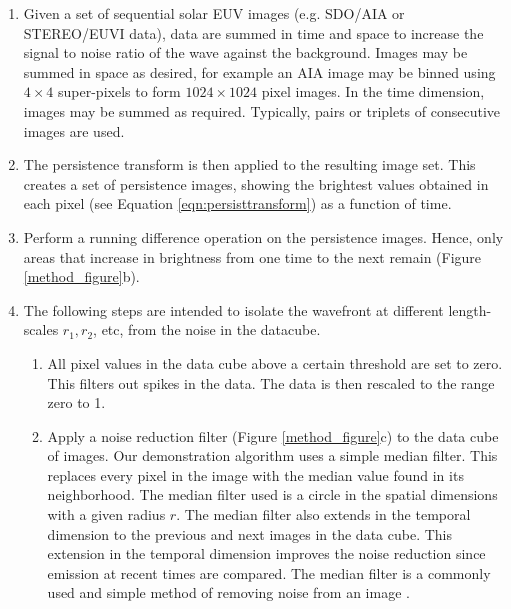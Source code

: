 \begin{enumerate}

\item Given a set of sequential solar EUV images (e.g. SDO/AIA or
  STEREO/EUVI data), data are summed in time and space to increase the
  signal to noise ratio of the wave against the background. Images may
  be summed in space as desired, for example an AIA image may be
  binned using $4\times4$ super-pixels to form $1024\times1024$ pixel
  images. In the time dimension, images may be summed as
  required. Typically, pairs or triplets of consecutive images are
  used.

\item The persistence transform is then applied to the resulting image
  set.  This creates a set of persistence images, showing the
  brightest values obtained in each pixel (see Equation
  \ref{eqn:persisttransform}) as a function of time.

\item Perform a running difference operation on the
  persistence images. Hence, only areas that increase in brightness
  from one time to the next remain (Figure \ref{method_figure}b).

\item 
The following steps are intended to isolate the wavefront at different
length-scales $r_{1}, r_{2}$\textellipsis, etc, from the noise in the
datacube.

\begin{enumerate}

\item All pixel values in the data cube above a certain threshold are
  set to zero. This filters out spikes in the data.  The data is then
  rescaled to the range zero to 1.

\item Apply a noise reduction filter (Figure \ref{method_figure}c) to
  the data cube of images.  Our demonstration algorithm uses a simple
  median filter.  This replaces every pixel in the image with the
  median value found in its neighborhood.  The median filter used is a
  circle in the spatial dimensions with a given radius $r$.  The
  median filter also extends in the temporal dimension to the previous
  and next images in the data cube.  This extension in the temporal
  dimension improves the noise reduction since emission at recent
  times are compared.  The median filter is a commonly used and simple
  method of removing noise from an image \citep{2002dip..book.....G}.


\end{enumerate}
\end{enumerate}
